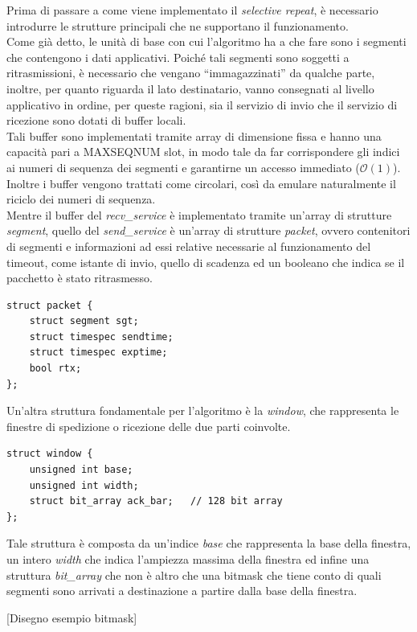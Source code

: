 Prima di passare a come viene implementato il \emph{selective repeat}, è 
necessario introdurre le strutture principali che ne supportano il 
funzionamento.\\
Come già detto, le unità di base con cui l'algoritmo ha a che fare sono
i segmenti che contengono i dati applicativi. Poiché tali segmenti sono
soggetti a ritrasmissioni, è necessario che vengano ``immagazzinati'' da 
qualche parte, inoltre, per quanto riguarda il lato destinatario, vanno
consegnati al livello applicativo in ordine, per queste ragioni, sia il 
servizio di invio che il servizio di ricezione sono dotati di buffer locali.\\
Tali buffer sono implementati tramite array di dimensione fissa e hanno una
capacità pari a MAXSEQNUM slot, in modo tale da far
corrispondere gli indici ai numeri di sequenza dei segmenti e 
garantirne un accesso immediato ($\mathcal{O}(1)$). Inoltre i buffer vengono
trattati come circolari, così da emulare naturalmente il riciclo dei numeri 
di sequenza.\\
Mentre il buffer del \emph{recv\_service} è implementato tramite un'array di 
strutture \emph{segment}, quello del \emph{send\_service} è un'array di 
strutture \emph{packet}, ovvero contenitori di segmenti e informazioni ad essi
relative necessarie al funzionamento del timeout, come istante di invio, quello
di scadenza ed un booleano che indica se il pacchetto è stato ritrasmesso.

\begin{lstlisting}[title=transport.h]
struct packet {
	struct segment sgt;
	struct timespec sendtime;
	struct timespec exptime;
	bool rtx;
};
\end{lstlisting}

Un'altra struttura fondamentale per l'algoritmo è la \emph{window}, che 
rappresenta le finestre di spedizione o ricezione delle due parti 
coinvolte.
\begin{lstlisting}[title=window.h]
struct window {
	unsigned int base;
	unsigned int width;
	struct bit_array ack_bar;	// 128 bit array
};
\end{lstlisting}
Tale struttura è composta da un'indice \emph{base} che rappresenta la base
della finestra, un intero \emph{width} che indica l'ampiezza massima della
finestra ed infine una struttura \emph{bit\_array} che non è altro che una
bitmask che tiene conto di quali segmenti sono arrivati a destinazione a 
partire dalla base della finestra.

[Disegno esempio bitmask] 


